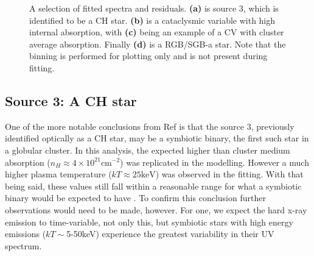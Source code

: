 \documentclass[aps,
                pra,  
                a4paper, 
                amsmath, 
                amssymb, 
                preprint,
                tightenlines,  
                amsfonts,
                nofootinbib,
                notitlepage
            ]{revtex4-2}
\begin{document}
\begin{figure}[H]
    \caption{A selection of fitted spectra and residuals. {\bf (a)} is source 3, which is identified to be a CH star. {\bf (b)} is a cataclysmic variable with high internal absorption, with {\bf (c)} being an example of a CV with cluster average absorption. Finally {\bf (d)} is a RGB/SGB-a star. Note that the binning is performed for plotting only and is not present during fitting.}
    \label{fig:main-4-spectra}
\end{figure}

\subsection{Source 3: A CH star}
One of the more notable conclusions from Ref \cite{Henleywillis2018} is that the source 3, previously identified optically as a CH star, may be a symbiotic binary, the first such star in a globular cluster. In this analysis, the expected higher than cluster medium absorption ($n_H\approx4\times10^{21}\text{cm}^{-2}$) was replicated in the modelling. However a much higher plasma temperature ($kT\approx25\text{keV}$) was observed in the fitting. With that being said, these values still fall within a reasonable range for what a symbiotic binary would be expected to have \cite{Luna2013}. To confirm this conclusion further observations would need to be made, however. For one, we expect the hard x-ray emission to time-variable, not only this, but symbiotic stars with high energy emissions ($kT\sim$5-50keV) experience the greatest variability in their UV spectrum\cite{Luna2013}. 
\end{document}
